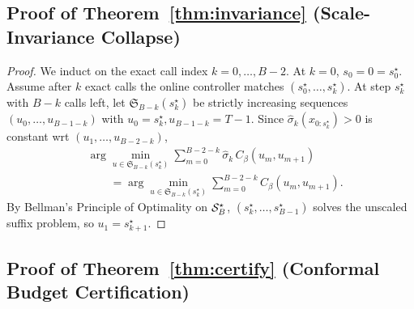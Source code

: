 \subsection{Proof of Theorem~\ref{thm:invariance} (Scale-Invariance Collapse)}
\label{app:proof_thm2}

\begin{proof}
We induct on the exact call index $k = 0, \dots, B - 2$. At $k=0$, $s_0 = 0 = s_0^\star$. Assume after $k$ exact calls the online controller matches $(s_0^\star, \dots, s_k^\star)$. At step $s_k^\star$ with $B - k$ calls left, let $\mathfrak{S}_{B-k}(s_k^\star)$ be strictly increasing sequences $(u_0, \dots, u_{B-1-k})$ with $u_0 = s_k^\star, u_{B-1-k} = T-1$. Since $\hat{\sigma}_k(x_{0:s_k^\star}) > 0$ is constant wrt $(u_1, \dots, u_{B-2-k})$,
\begin{equation}
\begin{aligned}
&\arg\min_{u \in \mathfrak{S}_{B-k}(s_k^\star)} \sum_{m=0}^{B-2-k} \hat{\sigma}_k\, C_\beta(u_m, u_{m+1}) \\
&\qquad = \arg\min_{u \in \mathfrak{S}_{B-k}(s_k^\star)} \sum_{m=0}^{B-2-k} C_\beta(u_m, u_{m+1}).
\end{aligned}
\end{equation}
By Bellman's Principle of Optimality on $\mathcal{S}_B^\star$, $(s_k^\star, \dots, s_{B-1}^\star)$ solves the unscaled suffix problem, so $u_1 = s_{k+1}^\star$.
\end{proof}

\subsection{Proof of Theorem~\ref{thm:certify} (Conformal Budget Certification)}
\label{app:proof_thm3_cert}

